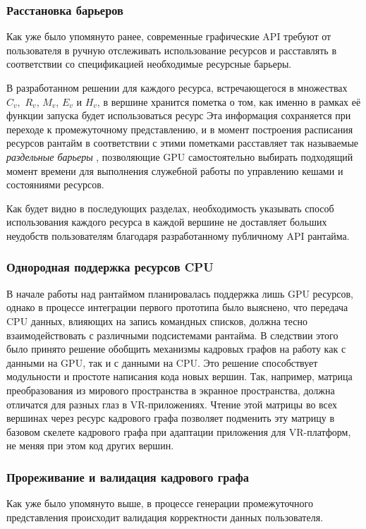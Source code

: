 \subsubsection{Расстановка барьеров}
Как уже было упомянуто ранее, современные графические API требуют от пользователя в ручную отслеживать использование ресурсов и расставлять в соответствии со спецификацией необходимые ресурсные барьеры.

В разработанном решении для каждого ресурса, встречающегося в множествах $C_v,$ $R_v$, $M_v$, $E_v$ и $H_v$, в вершине хранится пометка о том, как именно в рамках её функции запуска будет использоваться ресурс
Эта информация сохраняется при переходе к промежуточному представлению, и в момент построения расписания ресурсов рантайм в соответствии с этими пометками расставляет так называемые \textit{раздельные барьеры} \cite[раздел~7.5]{VulkanSpec}, позволяющие GPU самостоятельно выбирать подходящий момент времени для выполнения служебной работы по управлению кешами и состояниями ресурсов.

Как будет видно в последующих разделах, необходимость указывать способ использования каждого ресурса в каждой вершине не доставляет больших неудобств пользователям благодаря разработанному публичному API рантайма.

\subsubsection{Однородная поддержка ресурсов CPU}
В начале работы над рантаймом планировалась поддержка лишь GPU ресурсов, однако в процессе интеграции первого прототипа было выяснено, что передача CPU данных, влияющих на запись командных списков, должна тесно взаимодействовать с различными подсистемами рантайма.
В следствии этого было принято решение обобщить механизмы кадровых графов на работу как с данными на GPU, так и с данными на CPU.
Это решение способствует модульности и простоте написания кода новых вершин.
Так, например, матрица преобразования из мирового пространства в экранное пространства, должна отличатся для разных глаз в VR-приложениях.
Чтение этой матрицы во всех вершинах через ресурс кадрового графа позволяет подменить эту матрицу в базовом скелете кадрового графа при адаптации приложения для VR-платформ, не меняя при этом код других вершин.

\subsubsection{Прореживание и валидация кадрового графа}
Как уже было упомянуто выше, в процессе генерации промежуточного представления происходит валидация корректности данных пользователя.

